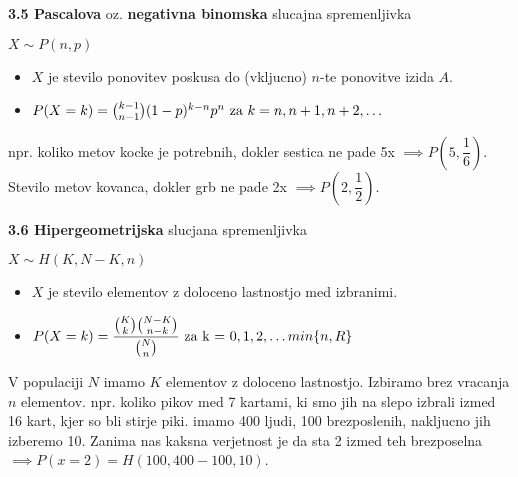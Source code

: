 \documentclass{article}
\begin{document}
\begin{multicols}{3}
\textbf{3.5 Pascalova} oz. \textbf{negativna binomska} slucajna spremenljivka
\begin{center}
    \begin{math}
        X \sim P(n, p)
    \end{math}
\end{center}
\begin{itemize}
    \item $X$ je stevilo ponovitev poskusa do (vkljucno) $n$-te ponovitve izida $A$.
    \item \begin{math}
        P(X = k) = {k - 1 \choose n - 1 }(1 - p)^{k - n} p^{n} $ za $ k = n, n + 1, n + 2, \dots
    \end{math}
\end{itemize}
npr. koliko metov kocke je potrebnih, dokler sestica ne pade 5x $\implies P(5, \dfrac{1}{6})$. Stevilo metov kovanca,
dokler grb ne pade 2x $\implies P(2, \dfrac{1}{2})$.

\textbf{3.6 Hipergeometrijska} slucjana spremenljivka
\begin{center}
    \begin{math}
        X \sim H(K, N - K, n)
    \end{math}
\end{center}
\begin{itemize}
    \item $X$ je stevilo elementov z doloceno lastnostjo med izbranimi.
    \item \begin{math}
        P(X = k) =  \dfrac{ {K \choose k} {N - K \choose n - k} }{{N \choose n}} $ za k = $ 0,1,2,\dots min\{ n, R \}
    \end{math}
\end{itemize}
V populaciji $N$  imamo $K$ elementov  z doloceno lastnostjo. Izbiramo brez vracanja $n$ elementov.
npr. koliko pikov med 7 kartami, ki smo jih na slepo izbrali izmed 16 kart, kjer so bli stirje piki.
imamo 400 ljudi, 100 brezposlenih, nakljucno jih izberemo 10. Zanima nas kaksna verjetnost je da sta 
2 izmed teh brezposelna $\implies P(x=2) = H(100, 400-100, 10)$. 


\end{multicols}
\end{document}
